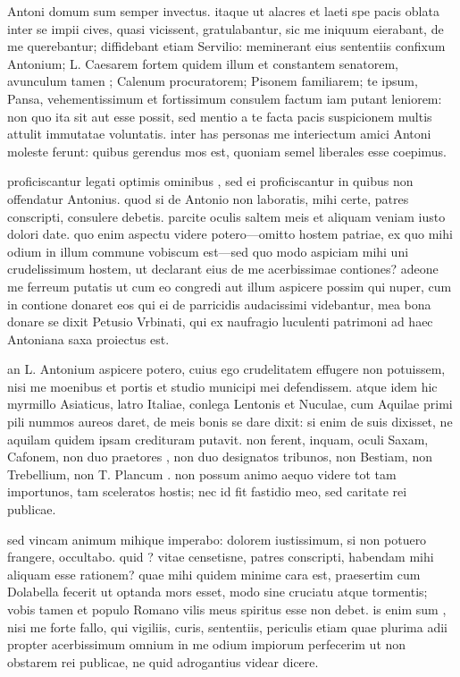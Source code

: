 Antoni domum sum semper invectus. itaque ut alacres et laeti spe pacis oblata inter se impii cives, quasi vicissent, gratulabantur, sic me iniquum eierabant, de me querebantur; diffidebant etiam Servilio: meminerant eius sententiis confixum Antonium; L. Caesarem fortem quidem illum et constantem senatorem, avunculum tamen ; Calenum procuratorem; Pisonem familiarem; te ipsum, Pansa, vehementissimum et fortissimum consulem factum iam putant leniorem: non quo ita sit aut esse possit, sed mentio a te facta pacis suspicionem multis attulit immutatae voluntatis. inter has personas me interiectum amici Antoni moleste ferunt: quibus gerendus mos est, quoniam semel liberales esse coepimus.

 proficiscantur legati optimis ominibus , sed ei proficiscantur in quibus non offendatur Antonius. quod si de Antonio non laboratis, mihi certe, patres conscripti, consulere debetis. parcite oculis saltem meis et aliquam veniam iusto dolori date. quo enim aspectu videre potero—omitto hostem patriae, ex quo mihi odium in illum commune vobiscum est—sed quo modo aspiciam mihi uni crudelissimum hostem, ut declarant eius de me acerbissimae contiones? adeone me ferreum putatis ut cum eo congredi aut illum aspicere possim qui nuper, cum in contione donaret eos qui ei de parricidis audacissimi videbantur, mea bona donare se dixit Petusio Vrbinati, qui ex naufragio luculenti patrimoni ad haec Antoniana saxa proiectus est.

 an L. Antonium aspicere potero, cuius ego crudelitatem effugere non potuissem, nisi me moenibus et portis et studio municipi mei defendissem. atque idem hic myrmillo Asiaticus, latro Italiae, conlega Lentonis et Nuculae, cum Aquilae primi pili nummos aureos daret, de meis bonis se dare dixit: si enim de suis dixisset, ne aquilam quidem ipsam credituram putavit. non ferent, inquam, oculi Saxam, Cafonem, non duo praetores , non duo designatos tribunos, non Bestiam, non Trebellium, non T. Plancum . non possum animo aequo videre tot tam importunos, tam sceleratos hostis; nec id fit fastidio meo, sed caritate rei publicae.

 sed vincam animum mihique imperabo: dolorem iustissimum, si non potuero frangere, occultabo. quid ? vitae censetisne, patres conscripti, habendam mihi aliquam esse rationem? quae mihi quidem minime cara est, praesertim cum Dolabella fecerit ut optanda mors esset, modo sine cruciatu atque tormentis; vobis tamen et populo Romano vilis meus spiritus esse non debet. is enim sum , nisi me forte fallo, qui vigiliis, curis, sententiis, periculis etiam quae plurima adii propter acerbissimum omnium in me odium impiorum perfecerim ut non obstarem rei publicae, ne quid adrogantius videar dicere.

